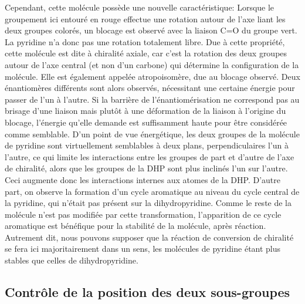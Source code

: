 \documentclass{article}
\begin{document}
Cependant, cette molécule possède une nouvelle caractéristique: Lorsque le groupement ici entouré en rouge effectue une rotation autour de l’axe liant les deux groupes colorés, un blocage est observé avec la liaison C=O du groupe vert. La pyridine n’a donc pas une rotation totalement libre. Due à cette propriété, cette molécule est dite à chiralité axiale, car c’est la rotation des deux groupes autour de l’axe central (et non d’un carbone) qui détermine la configuration de la molécule. Elle est également appelée atropoisomère, due au blocage observé. Deux énantiomères différents sont alors observés, nécessitant une certaine énergie pour passer de l’un à l’autre. Si la barrière de l’énantiomérisation ne correspond pas au brisage d’une liaison mais plutôt à une déformation de la liaison à l’origine du blocage, l'énergie qu’elle demande est suffisamment haute pour être considérée comme semblable.
\medbreak
\medbreak
D’un point de vue énergétique, les deux groupes de la molécule de pyridine sont virtuellement semblables à deux plans, perpendiculaires l'un à l'autre, ce qui limite les interactions entre les groupes de part et d'autre de l'axe de chiralité, alors que les groupes de la DHP sont plus inclinés l’un sur l’autre. Ceci augmente donc les interactions internes aux atomes de la DHP.
D’autre part, on observe la formation d’un cycle aromatique au niveau du cycle central de la pyridine, qui n’était pas présent sur la dihydropyridine. Comme le reste de la molécule n’est pas modifiée par cette transformation, l’apparition de ce cycle aromatique est bénéfique pour la stabilité de la molécule, après réaction. Autrement dit, nous pouvons supposer que la réaction de conversion de chiralité se fera ici majoritairement dans un sens, les molécules de pyridine étant plus stables que celles de dihydropyridine.
\medbreak
\subsection{Contrôle de la position des deux sous-groupes}
\end{document}
